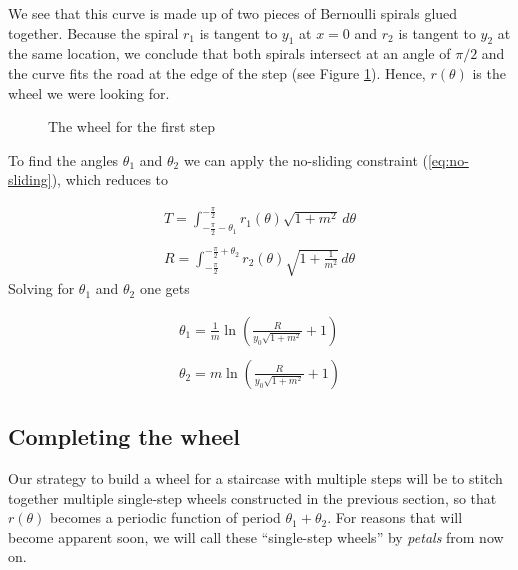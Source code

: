 \documentclass{article}
\theoremstyle{theorem}
\theoremstyle{theorem}
\begin{document}
We see that this curve is made up of two pieces of Bernoulli spirals
glued together. Because the spiral $r_1$ is tangent to $y_1$ at $x=0$
and $r_2$ is tangent to $y_2$ at the same location, we conclude that
both spirals intersect at an angle of $\pi/2$ and the curve fits the
road at the edge of the step (see Figure \ref{fig:petal}). Hence,
$r(\theta)$ is the wheel we were looking for.

\begin{figure}[h]
  \centering 
  \caption{The wheel for the first step}
  \label{fig:petal}
\end{figure}

To find the angles $\theta_1$ and $\theta_2$ we can apply the
no-sliding constraint (\ref{eq:no-sliding}), which reduces to

\begin{equation}
  \begin{array}{c}
    \displaystyle T=\int^{-\frac{\pi}{2}}_{-\frac{\pi}{2}-\theta_1}r_1(\theta)\sqrt{1+m^2}
    \,d\theta\\
    \\
    \displaystyle R=\int^{-\frac{\pi}{2}+\theta_2}_{-\frac{\pi}{2}}r_2(\theta)\sqrt{1+\frac{1}{m^2}} \,d\theta
  \end{array}
\end{equation}
Solving for $\theta_1$ and $\theta_2$ one gets

\begin{equation}
  \label{eq:thetas}
  \begin{array}{c}
    \displaystyle
    \theta_1=\frac{1}{m}\ln\left(\frac{R}{y_0\sqrt{1+m^2}}+1\right) \\
    \\
    \displaystyle \theta_2=m\ln\left(\frac{R}{y_0\sqrt{1+m^2}}+1\right)
  \end{array}
\end{equation}


\subsection{Completing the wheel}

Our strategy to build a wheel for a staircase with multiple steps will
be to stitch together multiple single-step wheels constructed in the
previous section, so that $r(\theta)$ becomes a periodic function of
period $\theta_1+\theta_2$. For reasons that will become apparent
soon, we will call these ``single-step wheels'' by \emph{petals} from
now on.
\end{document}
